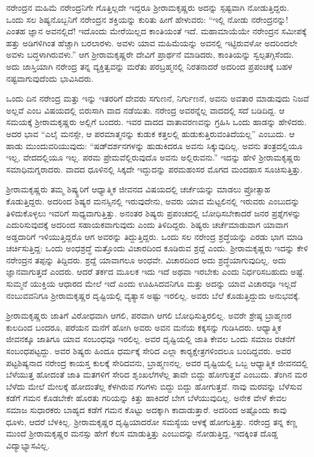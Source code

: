 ನರೇಂದ್ರನ ಮಹಿಮೆ ನರೇಂದ್ರನಿಗೇ ಗೊತ್ತಿಲ್ಲದೇ ಇದ್ದರೂ ಶ‍್ರೀರಾಮಕೃಷ್ಣರು ಅದನ್ನು ಸ್ಪಷ್ಟವಾಗಿ ನೋಡುತ್ತಿದ್ದರು. ಒಂದು ಸಲ ಶಿಷ್ಯನೊಬ್ಬನಿಗೆ ನರೇಂದ್ರನ ಶಕ್ತಿಯನ್ನು ಕುರಿತು ಹೀಗೆ ಹೇಳುವರು: “ಇಲ್ಲಿ ನೋಡು ನರೇಂದ್ರನನ್ನು! ಎಂತಹ ಜ್ಞಾನ ಅವನಲ್ಲಿದೆ! ಇದೊಂದು ಮೇರೆಯಿಲ್ಲದ ಕಾಂತಿಯಂತೆ ಇದೆ. ಮಹಾಮಾಯೆಯೇ ನರೇಂದ್ರನ ಸಮೀಪಕ್ಕೆ ಹತ್ತು ಅಡಿಗಳಿಗಿಂತ ಹೆಚ್ಚಾಗಿ ಬರಲಾರಳು. ಅವಳು ಯಾವ ಮಹಿಮೆಯನ್ನು ಅವನಲ್ಲಿ ಇಟ್ಟಿರುವಳೋ ಅದರಿಂದಲೇ ಅವಳು ಬದ್ಧಳಾಗಿರುವಳು.” ಆಗ ಶ‍್ರೀರಾಮಕೃಷ್ಣರೇ ದೇವಿಗೆ ಪ್ರಾರ್ಥನೆ ಮಾಡಿದರು, ಕಾಂತಿಯನ್ನು ಸ್ವಲ್ಪ\break ತಗ್ಗಿಸೆಂದು. ಅದು ಜಾಸ್ತಿಯಾಗಿ ನರೇಂದ್ರ ತನ್ನ ವ್ಯಕ್ತಿತ್ವವನ್ನು ಮರೆತು ಪರಬ್ರಹ್ಮನಲ್ಲಿ ನಿರತನಾದರೆ ಅದರಿಂದ ಪ್ರಪಂಚಕ್ಕೆ ಬಹಳ ನಷ್ಟವಾಗುವುದೆಂದು ಭಾವಿಸಿದರು.

ಒಂದು ದಿನ ನರೇಂದ್ರ ಮತ್ತು ಇನ್ನು ಇತರರಿಗೆ ದೇವರು ಸಗುಣನೆ, ನಿರ್ಗುಣನೆ, ಅವನು ಅವತಾರ ಮಾಡುವುದು ನಿಜವೆ ಅಲ್ಲವೆ ಎಂಬ ವಿಷಯದಲ್ಲಿ ಬಿರುಸಾಗಿ ವಾದ ನಡೆಯಿತು. ನರೇಂದ್ರ ಅವರನ್ನೆಲ್ಲ ವಾದದಲ್ಲಿ ಸದೆ ಬಡಿದಿದ್ದ. ಆ ಸಮಯಕ್ಕೆ ಶ‍್ರೀರಾಮಕೃಷ್ಣರು ಅಲ್ಲಿಗೆ ಬಂದರು. ಇವರ ವಾದದ ವಾತಾವರಣವನ್ನು ಗ್ರಹಿಸಿ ಒಂದು ಹಾಡನ್ನು ಹೇಳಿದರು. ಅದರ ಭಾವ “ಎಲೈ ಮನಸ್ಸೇ, ಆ ಪರಮಾತ್ಮನನ್ನು ಕುಡುಕ ಕತ್ತಲಲ್ಲಿ ಹುಡುಕುತ್ತಿರುವಂತಿದೆಯಲ್ಲ” ಎಂಬುದು. ಆ ಹಾಡು ಮುಂದುವರಿಯುವುದು: “ಷಡ್‍ದರ್ಶನಗಳನ್ನು ಹುಡುಕಿದರೂ ಅವನು ಸಿಕ್ಕುವುದಿಲ್ಲ. ಅವನು ತಂತ್ರದಲ್ಲಿಯೂ ಇಲ್ಲ, ವೇದದಲ್ಲಿಯೂ ಇಲ್ಲ. ಪರಮ ಪ್ರೇಮವೆಲ್ಲಿರುವುದೊ ಅವನು ಅಲ್ಲಿರುವನು.” ಇದನ್ನು ಹೇಳಿ ಶ‍್ರೀರಾಮಕೃಷ್ಣರು ಸಮಾಧಿಮಗ್ನರಾದರು. ವಾದದ ಧೂಳಿನಲ್ಲಿ ಸಿಕ್ಕದೇ ಇದ್ದುದನ್ನು ಪರಮಹಂಸರ ಮೊಗದ ಮಂದಹಾಸ ಸೂಚಿಸುತ್ತಿತ್ತು.

ಶ‍್ರೀರಾಮಕೃಷ್ಣರು ತಮ್ಮ ಶಿಷ್ಯ್ತರಿಗೆ ಆಧ್ಯಾತ್ಮಿಕ ಜೀವನದ ವಿಷಯದಲ್ಲಿ ಚರ್ಚೆಯನ್ನು ಮಾಡಲು ಪ್ರೋತ್ಸಾಹ ಕೊಡುತ್ತಿದ್ದರು. ಅದರಿಂದ ಶಿಷ್ಯರ ಮನಸ್ಸಿನಲ್ಲಿ ಇರುವುದೇನು, ಅವರು ಯಾವ ಮೆಟ್ಟಲಿನಲ್ಲಿ ಇರುವರು ಎಂಬುದನ್ನು ತಿಳಿದುಕೊಳ್ಳಲು ಇವರಿಗೆ ಸಾಧ್ಯವಾಗುತ್ತಿತ್ತು. ಅನಂತರ ಶಿಷ್ಯರು ಪ್ರಪಂಚದಲ್ಲಿ ಬೋಧಿಸಬೇಕಾದರೆ ಜನರ ಪ್ರಶ್ನೆಗಳನ್ನು ಎದುರಿಸುವುದಕ್ಕೆ ಅದರಿಂದ ಸಹಾಯಕವಾಗುವುದು ಎಂದು ತಿಳಿದಿದ್ದರು. ಶಿಷ್ಯರು ಚರ್ಚೆಮಾಡುವಾಗ ಯಾವಾಗ ಅಡ್ಡದಾರಿಗೆ ಇಳಿಯುತ್ತಿದ್ದರೊ ಆಗ ಅವರನ್ನು ತಿದ್ದುತ್ತಿದ್ದರು. ಒಂದು ಸಲ ನರೇಂದ್ರ ಶ್ರದ್ಧೆಯನ್ನು ಎರಡು ಭಾಗ ಮಾಡಿ ಚರ್ಚಿಸುತ್ತಿದ್ದ: ಒಂದು ಅಂಧಶ್ರದ್ಧೆ ಮತ್ತೊಂದು ವಿಚಾರದಿಂದ ಕೂಡಿರುವ ಶ್ರದ್ದೆ ಎಂದು. ಶ‍್ರೀರಾಮಕೃಷ್ಣರು ಇದನ್ನು ಕೇಳಿ ನರೇಂದ್ರನ ತಪ್ಪನ್ನು ತಿದ್ದಿದರು. ಶ್ರದ್ದೆ ಯಾವಾಗಲೂ ಅಂಧವೇ. ವಿಚಾರದಿಂದ ಅದು ಶ್ರದ್ಧೆಯಾಗುವುದಿಲ್ಲ. ಅದು ಜ್ಞಾನವಾಗುತ್ತದೆ ಎಂದರು. ಆದರೆ ತರ್ಕದ ಮೂಲಕ ಇದು ಇದೆ ಅಥವಾ ಇರಬೇಕು ಎಂದು ನಿರ್ಧರಿಸಬಹುದು ಅಷ್ಟೆ. ಸುಮ್ಮನೆ ಯುಕ್ತಿಯ ಆಧಾರದ ಮೇಲೆ ಇದೆ ಎಂದು ಊಹಿಸಿದವನಿಗೂ ಮತ್ತು ಅದನ್ನು ಯಾವ ವಿಚಾರವೂ ಇಲ್ಲದೆ ನಂಬುವವನಿಗೂ ಶ‍್ರೀರಾಮಕೃಷ್ಣರ ದೃಷ್ಟಿಯಲ್ಲಿ ವ್ಯತ್ಯಾಸ ಅಷ್ಟು ಇರಲಿಲ್ಲ. ಅವರು ಬೆಲೆ ಕೊಡುತ್ತಿದ್ದುದು ಅನುಭವಕ್ಕೆ.

ಶ‍್ರೀರಾಮಕೃಷ್ಣರು ಜಾತಿಗೆ ವಿರೋಧವಾಗಿ ಆಗಲಿ, ಪರವಾಗಿ ಆಗಲಿ ಬೋಧಿಸುತ್ತಿರಲಿಲ್ಲ. ಅವರೇ ಶ್ರೇಷ್ಠ ಬ್ರಾಹ್ಮಣರ ಕುಲದಿಂದ ಬಂದರೂ, ಪರೆಯನ ಮನೆಗೆ ಹೋಗಿ ಅವರು ಅವನ ಮನೆಯ ಕಕ್ಕಸನ್ನು ಗುಡಿಸಿದರು. ಆಧ್ಯಾತ್ಮಿಕ ಜೀವನಕ್ಕೂ ಜಾತಿಗೂ ಯಾವ ಸಂಬಂಧವೂ ಇರಲಿಲ್ಲ. ಅವರ ದೃಷ್ಟಿಯಲ್ಲಿ ಜಾತಿ ಕೇವಲ ಒಂದು ಸಮಾಜ ರಚನೆಗೆ ಸಂಬಂಧಪಟ್ಟದ್ದು. ಅವರ ಶಿಷ್ಯರು ಹಿಂದೂ ಧರ್ಮಕ್ಕೆ ಸೇರಿದ ಎಲ್ಲಾ ಕಾರ‍್ಯಕ್ಷೇತ್ರಗಳಿಂದಲೂ ಬಂದಿದ್ದವರು. ಅವರ ಪಟ್ಟಶಿಷ್ಯನಾದ ನರೇಂದ್ರ ಕಾಯಸ್ತ ಕುಲಕ್ಕೆ ಸೇರಿದವನು, ಬ್ರಾಹ್ಮಣನಲ್ಲ. ಅವರ ದೃಷ್ಟಿಯಲ್ಲಿ ಒಬ್ಬ ಆಧ್ಯಾತ್ಮಿಕ ಜೀವನದಲ್ಲಿ ಬೆಳೆಯುತ್ತ ಹೋದಂತೆ ಜಾತಿ ಮತಗಳಿಗೆ ಸೇರಿದ ಶೃಂಖಲೆಗಳೆಲ್ಲ ತಾವೇ ಬಿದ್ದು ಹೋಗುತ್ತವೆ ಎಂಬುದು. ತೆಂಗಿನ ಮರ ಬೆಳೆದು ಮೇಲೆ ಮೇಲಕ್ಕೆ ಹೋದಂತೆಲ್ಲ ಕೆಳಗಿರುವ ಗರಿಗಳು ಬಿದ್ದು ಬಿದ್ದು ಹೋಗುತ್ತವೆ. ನಾವು ಮರವನ್ನು ಬೆಳೆಸುವ ಕಡೆಗೆ ಗಮನ ಕೊಡಬೇಕೇ ಹೊರತು ಗರಿಯನ್ನು ಕಿತ್ತು ಹಾಕಿದರೆ ಬೇಗ ಬೆಳೆಯುವುದಿಲ್ಲ. ಅನೇಕ ವೇಳೆ ಕೇವಲ ಸಮಾಜ ಸುಧಾರಕರು ಬಾಹ್ಯದ ಕಡೆಗೆ ಗಮನ ಕೊಟ್ಟು ಅದಕ್ಕಾಗಿ ಕಾದಾಡುತ್ತಾರೆ. ಅದರಿಂದ ಅಷ್ಟೊಂದು ಕಾವು ಧೂಳು, ಆದರೆ ಬೆಳಕಿಲ್ಲ. ಶ‍್ರೀರಾಮಕೃಷ್ಣರ ದೃಷ್ಟಿಯಾದರೋ ಸಮಸ್ಯೆಯ ಆಳಕ್ಕೆ ಹೋಗುತ್ತಿತ್ತು. ನರೇಂದ್ರ ತನ್ನ ಕಣ್ಣ ಮುಂದೆ ಶ‍್ರೀರಾಮಕೃಷ್ಣರ ಮನಸ್ಸು ಹೇಗೆ ಕೆಲಸ ಮಾಡುತ್ತಿತ್ತು ಎಂಬುದನ್ನು ನೋಡುತ್ತಿದ್ದ, ಇದಕ್ಕಿಂತ ದೊಡ್ಡ ವಿದ್ಯಾಭ್ಯಾಸವಿಲ್ಲ.


